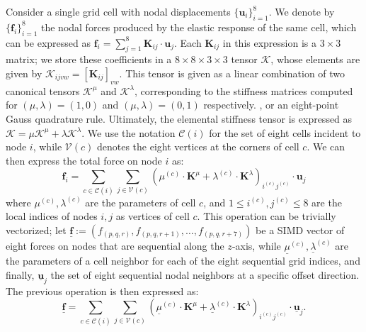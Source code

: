 Consider a single grid cell with nodal displacements $\{\mathbf{u}_i\}_{i=1}^8$. We denote by $\{\mathbf{f}_i\}_{i=1}^8$
the nodal forces produced by the elastic response of the same cell, which can be expressed as 
$\mathbf{f}_i = \sum^8_{j = 1} \mathbf{K}_{ij} \cdot \mathbf{u}_j$. Each $\mathbf{K}_{ij}$ in this expression is a
$3\times 3$ matrix; we store these coefficients in a $8\times 8\times 3\times 3$ tensor $\mathcal{K}$, whose elements
are given by $\mathcal{K}_{ijvw}=[\mathbf{K}_{ij}]_{vw}$. This tensor is given as a linear combination of two canonical
tensors $\mathcal{K}^\mu$ and $\mathcal{K}^\lambda$, corresponding to the stiffness matrices computed for
$(\mu,\lambda)=(1,0)$ and $(\mu,\lambda)=(0,1)$ respectively. ,
or an eight-point Gauss quadrature rule. Ultimately, the elemental stiffness
tensor is expressed as $\mathcal{K}=\mu\mathcal{K}^\mu+\lambda\mathcal{K}^\lambda$. 
We use the notation $\mathcal{C}(i)$ for the set of eight cells incident to node $i$, while $\mathcal{V}(c)$ denotes the eight vertices at the corners of cell $c$. We can then express the total force on node $i$ as:
$$
\mathbf{f}_i = \sum_{c \in \mathcal{C}(i)} \sum_{j\in \mathcal{V}(c)} (\mu^{(c)} \cdot \mathbf{K}^\mu + \lambda^{(c)} \cdot \mathbf{K}^\lambda)_{i^{(c)}j^{(c)}} \cdot \mathbf{u}_j
$$
where $\mu^{(c)},\lambda^{(c)}$ are the parameters of cell $c$, and $1\leq i^{(c)},j^{(c)}\leq 8$ are the local indices of nodes $i,j$ as vertices of cell $c$. 
This operation can be trivially vectorized; let $\underline{\mathbf{f}}:=(f_{(p,q,r)},f_{(p,q,r+1)},\ldots,f_{(p,q,r+7)})$ be a SIMD vector of eight forces on nodes that are sequential along the $z$-axis, while $\underline{\mu}^{(c)}, \underline{\lambda}^{(c)}$ are the parameters of a cell neighbor for each of the eight sequential grid indices, and finally, $\underline{\mathbf{u}}_j$ the set of eight sequential nodal neighbors at a specific offset direction. The previous operation is then expressed as:
\begin{equation}
\underline{\mathbf{f}} = \sum_{c \in \mathcal{C}(i)} \sum_{j\in \mathcal{V}(c)} (\underline{\mu}^{(c)} \cdot \mathbf{K}^\mu + \underline{\lambda}^{(c)} \cdot \mathbf{K}^\lambda)_{i^{(c)}j^{(c)}} \cdot \underline{\mathbf{u}}_j .
\label{eqn:elasticity-stencil}
\end{equation}
